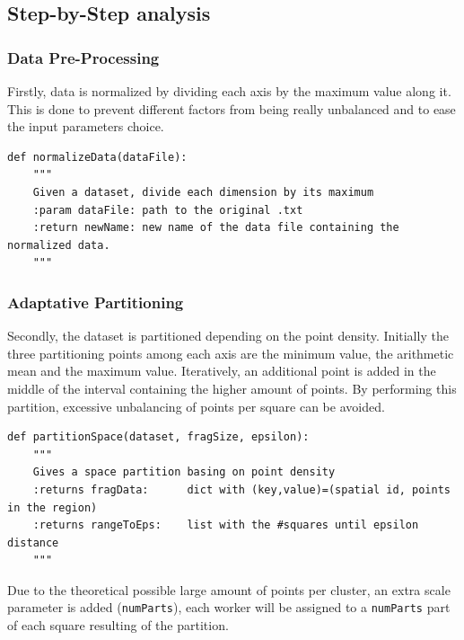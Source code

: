 \documentclass[10pt,journal,compsoc]{IEEEtran}
\begin{document}
\subsection{Step-by-Step analysis} \label{step_by_step}

\subsubsection*{Data Pre-Processing} \label{data_pre_process}
Firstly, data is normalized by dividing each axis by the maximum value along it. This is done to prevent different factors from being really unbalanced and to ease the input parameters choice.
\begin{lstlisting}
def normalizeData(dataFile):
    """ 
    Given a dataset, divide each dimension by its maximum
    :param dataFile: path to the original .txt
    :return newName: new name of the data file containing the normalized data.
    """
\end{lstlisting}
\subsubsection*{Adaptative Partitioning} \label{partition_space} 
Secondly, the dataset is partitioned depending on the point density. Initially the three partitioning points among each axis are the minimum value, the arithmetic mean and the maximum value. Iteratively, an additional point is added in the middle of the interval containing the higher amount of points. By performing this partition, excessive unbalancing of points per square can be avoided. 
\begin{lstlisting}
def partitionSpace(dataset, fragSize, epsilon):
    """ 
    Gives a space partition basing on point density
    :returns fragData:      dict with (key,value)=(spatial id, points in the region)
    :returns rangeToEps:    list with the #squares until epsilon distance 
    """
\end{lstlisting}
Due to the theoretical possible large amount of points per cluster, an extra scale parameter is added (\texttt{numParts}), each worker will be assigned to a \texttt{numParts} part of each square resulting of the partition.
\end{document}
